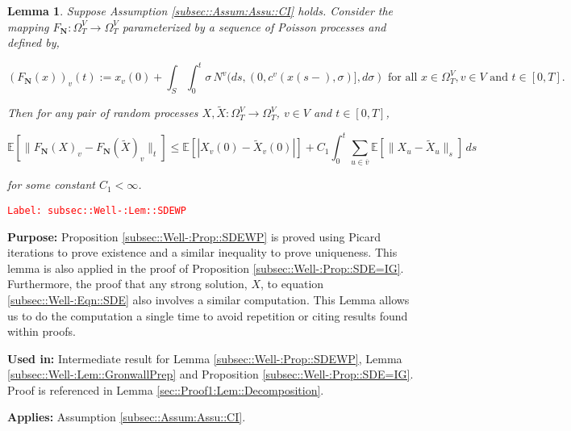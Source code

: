 \documentclass[12pt]{article}
\newcommand{\mb}{\mathbb}
\newcommand{\ra}{\rightarrow}
\newcommand{\ov}{\overline}
\newcommand{\te}{\text}
\newcommand{\tr}{\textcolor{red}}
\newcommand{\labe}[1]{\tr{\texttt{Label: #1}}}
\newcommand{\purpose}{\textbf{Purpose: }}
\newcommand{\usein}{\textbf{Used in: }}
\newcommand{\app}{\textbf{Applies: }}
\newcommand{\ex}[1]{\mb{E}\left[#1\right]}			%
\renewcommand{\v}{v}							%
\newcommand{\vv}{u}								%
\renewcommand{\S}{S}							%
\newcommand{\s}{\sigma}							%
\newcommand{\T}{T}								%
\newcommand{\x}{x}								%
\renewcommand{\t}{t}							%
\newcommand{\sset}{\Omega}						%
\renewcommand{\tt}{s}							%
\newcommand{\X}{X}								%
\newcommand{\IGr}{c}							%
\newcommand{\vind}[1]{^{#1}}					%
\newcommand{\vsi}[1]{^{#1}}						%
\newcommand{\cind}[1]{_{#1}}					%
\newcommand{\cl}{\ov}							%
\newcommand{\tp}[1]{(#1)}						%
\newcommand{\ts}[1]{_{#1}}						%
\newcommand{\const}{C}							%
\newcommand{\poisses}{\mathbf{N}}				%
\newcommand{\poiss}{N}							%
\newcommand{\Fpo}{F_{\poisses}}					%
\newcommand{\alt}[1]{\widetilde{#1}}			%
\newcommand{\indx}[1]{_{#1}}					%
\newtheorem{lem}[thms]{Lemma}
\begin{document}
\begin{lem}
Suppose Assumption \ref{subsec::Assum:Assu::CI} holds. Consider the mapping \(\Fpo: \sset\vsi{V}\ts{\T} \ra \sset\vsi{V}\ts{\T}\) parameterized by a sequence of Poisson processes and defined by,

\[\left(\Fpo(\x)\right)\cind{\v}\tp{\t} := \x\cind{\v}\tp{0} + \int_\S\int_0^\t \s \,\poiss\vind{\v}(d\tt,(0,\IGr\vind{\v}(\x\tp{\tt-},\s)],d\s) \te{ for all }\x \in \sset\vsi{V}\ts{\T}, \v \in V\te{ and }\t \in [0,\T].\]

Then for any pair of random processes \(\X,\alt{\X}:\sset\vsi{V}\ts{\T} \ra \sset\vsi{V}\ts{\T}\), \(\v\in V\) and \(\t \in [0,\T]\),

\[\ex{\|\Fpo(\X)\cind{\v} - \Fpo(\alt{\X})\cind{\v}\|_\t} \leq \ex{|\X\cind{\v}\tp{0} - \alt{\X}\cind{\v}\tp{0}|} +  \const\indx{1}\int_0^\t \sum_{\vv\in \cl{\v}} \ex{\|\X\cind{\vv} - \alt{\X}\cind{\vv}\|_\tt}\,d\tt\]

for some constant \(\const\indx{1} < \infty\).

\label{subsec::Well-:Lem::SDEWP}
\end{lem}
\labe{subsec::Well-:Lem::SDEWP}

\purpose Proposition \ref{subsec::Well-:Prop::SDEWP} is proved using Picard iterations to prove existence and a similar inequality to prove uniqueness. This lemma is also applied in the proof of Proposition \ref{subsec::Well-:Prop::SDE=IG}. Furthermore, the proof that any strong solution, \(\X\), to equation \eqref{subsec::Well-:Eqn::SDE} also involves a similar computation. This Lemma allows us to do the computation a single time to avoid repetition or citing results found within proofs.

\usein Intermediate result for Lemma \ref{subsec::Well-:Prop::SDEWP}, Lemma \ref{subsec::Well-:Lem::GronwallPrep} and Proposition \ref{subsec::Well-:Prop::SDE=IG}. Proof is referenced in Lemma \ref{sec::Proof1:Lem::Decomposition}.

\app Assumption \ref{subsec::Assum:Assu::CI}.
\end{document}

